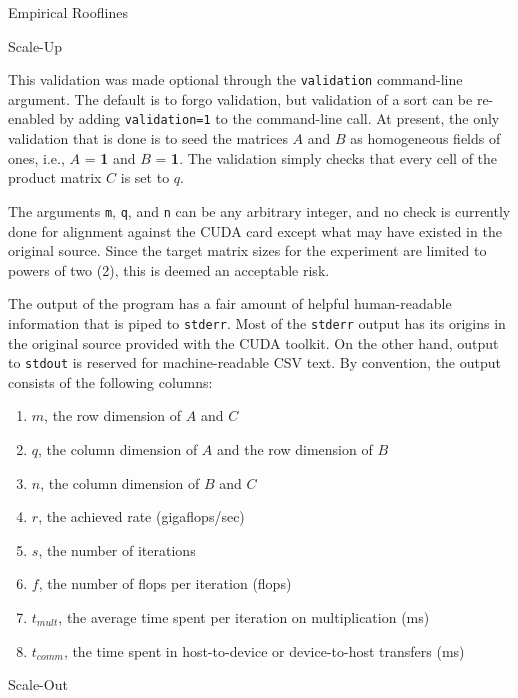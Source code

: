 \documentclass{article}
\begin{document}
\begin{section}{Empirical Rooflines}
\begin{subsection}{Scale-Up}
\begin{paragraph}{}
      This validation was made optional through the \texttt{validation} command-line argument. The default is to forgo validation, but validation of a sort
      can be re-enabled by adding \texttt{validation=1} to the command-line call. At present, the only validation that is done is to seed the matrices $A$
      and $B$ as homogeneous fields of ones, i.e., $A$ = \textbf{1} and $B$ = \textbf{1}. The validation simply checks that every cell of the product matrix
      $C$ is set to $q$.
    \end{paragraph}
    \begin{paragraph}{}
      The arguments \texttt{m}, \texttt{q}, and \texttt{n} can be any arbitrary integer, and no check is currently done for alignment against the CUDA card
      except what may have existed in the original source. Since the target matrix sizes for the experiment are limited to powers of two (2), this is deemed
      an acceptable risk.
    \end{paragraph}
    \begin{paragraph}{}
      The output of the program has a fair amount of helpful human-readable information that is piped to \texttt{stderr}. Most of the \texttt{stderr} output
      has its origins in the original source provided with the CUDA toolkit. On the other hand, output to \texttt{stdout} is reserved for machine-readable CSV text.
      By convention, the output consists of the following columns:
      \begin{enumerate}
      \item{$m$, the row dimension of $A$ and $C$}
      \item{$q$, the column dimension of $A$ and the row dimension of $B$}
      \item{$n$, the column dimension of $B$ and $C$}
      \item{$r$, the achieved rate (gigaflops/sec)}
      \item{$s$, the number of iterations}
      \item{$f$, the number of flops per iteration (flops)}
      \item{$t_{mult}$, the average time spent per iteration on multiplication (ms)}
      \item{$t_{comm}$, the time spent in host-to-device or device-to-host transfers (ms)}
      \end{enumerate}
    \end{paragraph}
  \end{subsection}
  \begin{subsection}{Scale-Out}

\end{subsection}
\end{section}
\end{document}
